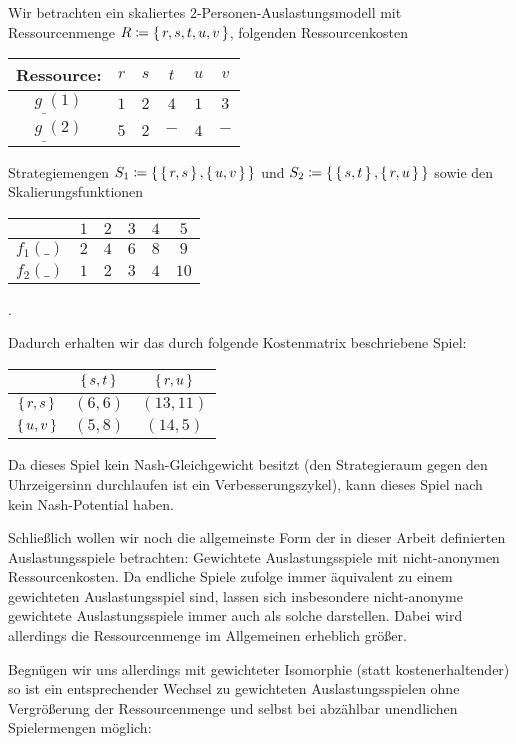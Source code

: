 \begin{bsp}
	Wir betrachten ein skaliertes $2$-Personen-Auslastungsmodell mit Ressourcenmenge $R \coloneqq \set{r, s, t, u, v}$, folgenden Ressourcenkosten
	\begin{center}\begin{tabular}{c|ccccc}
		Ressource:	& $r$ 	& $s$	& $t$	& $u$	& $v$	\\\hline\hline
		$g_{\_}(1)$	& $1$	& $2$	& $4$	& $1$	& $3$	\\\hline
		$g_{\_}(2)$	& $5$	& $2$ 	& $-$	& $4$	& $-$
	\end{tabular}\end{center}
	Strategiemengen $S_1 \coloneqq \set{\set{r,s}, \set{u,v}}$ und $S_2 \coloneqq \set{\set{s,t}, \set{r,u}}$ sowie den Skalierungsfunktionen
	\begin{center}\begin{tabular}{c|ccccc}
						& $1$ 	& $2$	& $3$	& $4$	& $5$	\\\hline\hline
			$f_1(\_)$	& $2$	& $4$	& $6$	& $8$	& $9$	\\\hline
			$f_2(\_)$	& $1$	& $2$ 	& $3$	& $4$	& $10$
	\end{tabular}.\end{center}
	Dadurch erhalten wir das durch folgende Kostenmatrix beschriebene Spiel:	
		\begin{center}\begin{tabular}{c||c|c}
						& $\set{s,t}$	& $\set{r,u}$	\\\hline\hline
			$\set{r,s}$	& $(6,6)$		& $(13,11)$		\\\hline
			$\set{u,v}$	& $(5,8)$		& $(14,5)$ 
		\end{tabular}\end{center}
	Da dieses Spiel kein Nash-Gleichgewicht besitzt (den Strategieraum gegen den Uhrzeigersinn durchlaufen ist ein Verbesserungszykel), kann dieses Spiel nach  kein Nash-Potential haben.
\end{bsp}

Schließlich wollen wir noch die allgemeinste Form der in dieser Arbeit definierten Auslastungsspiele betrachten: Gewichtete Auslastungsspiele mit nicht-anonymen Ressourcenkosten. Da endliche Spiele  zufolge immer äquivalent zu einem gewichteten Auslastungsspiel sind, lassen sich insbesondere nicht-anonyme gewichtete Auslastungsspiele immer auch als solche darstellen. Dabei wird allerdings die Ressourcenmenge im Allgemeinen erheblich größer. 

Begnügen wir uns allerdings mit gewichteter Isomorphie (statt kostenerhaltender) so ist ein entsprechender Wechsel zu gewichteten Auslastungsspielen ohne Vergrößerung der Ressourcenmenge und selbst bei abzählbar unendlichen Spielermengen möglich:

